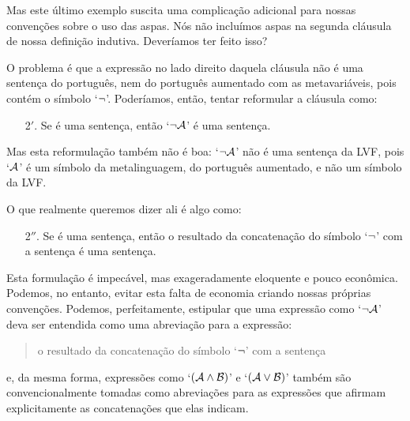 Mas este último exemplo suscita uma complicação adicional para nossas convenções sobre o uso das aspas.
Nós não incluímos aspas na segunda cláusula de nossa definição indutiva. Deveríamos ter feito isso?

O problema é que a expressão no lado direito daquela cláusula não é uma sentença do português, nem do português aumentado com as metavariáveis, pois contém o símbolo `$\neg$'.
Poderíamos, então, tentar reformular a cláusula como:
	\begin{enumerate}
		\item[2$'$.] Se  é uma sentença, então `$\neg \mathcal{A}$' é uma sentença.
	\end{enumerate}
Mas esta reformulação também não é boa:
`$\neg\mathcal{A}$' não é uma sentença da LVF, pois `$\mathcal{A}$' é um símbolo da metalinguagem, do português aumentado, e não um símbolo da LVF.

O que realmente queremos dizer ali é algo como:
	\begin{enumerate}
		\item[2$''$.] Se  é uma sentença, então o resultado da concatenação do símbolo `$\neg$' com a sentença  é uma sentença.
	\end{enumerate}
Esta formulação é impecável, mas exageradamente eloquente e pouco econômica.
Podemos, no entanto, evitar esta falta de economia criando nossas próprias convenções.
Podemos, perfeitamente, estipular que uma expressão como `$\neg\mathcal{A}$' deva ser entendida como uma abreviação para a expressão:
\begin{quote}
	o resultado da concatenação do símbolo `$\neg$' com a sentença 
\end{quote}
e, da mesma forma, expressões como `$(\mathcal{A} \wedge \mathcal{B})$' e `$(\mathcal{A} \vee \mathcal{B})$' também são convencionalmente tomadas como abreviações para as expressões que afirmam explicitamente as concatenações que elas indicam.


